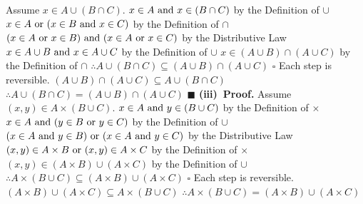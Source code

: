 \documentclass[12pt]{article}
\begin{document}
	Assume \(x \in A \cup (B \cap C)\). \newline
	\(x \in A \textup{ and } x \in (B \cap C)\) by the Definition of \(\cup\)
	\newline
	\(x \in A \textup{ or } (x \in B \textup{ and } x \in C)\) by the Definition of \(\cap\)
	\newline
	\((x \in A \textup{ or } x \in B) \textup{ and } (x \in A \textup{ or } x \in C)\) by the Distributive Law
	\newline
	\(x \in A \cup B \textup{ and } x \in A \cup C\) by the Definition of \(\cup\)
	\newline
	\(x \in (A \cup B) \cap (A \cup C)\) by the Definition of \(\cap\)
	\newline
	\(\therefore A \cup (B \cap C) \subseteq (A \cup B) \cap (A \cup C)\)
	\newline \(\square\) \newline
	Each step is reversible.
	\newline
	\((A \cup B) \cap (A \cup C) \subseteq A \cup (B \cap C)\)
	\newline
	\(\therefore A \cup (B \cap C) = (A \cup B) \cap (A \cup C)\)
	\newline \(\blacksquare\)
	\newline
	\newline
	\textbf{(iii)\ Proof.}
	\newline
	Assume \((x,y) \in A \times (B \cup C)\). \newline
	\(x \in A \textup{ and } y \in (B \cup C)\) by the Definition of \(\times\)
	\newline
	\(x \in A \textup{ and } (y \in B \textup{ or } y \in C)\) by the Definition of \(\cup\)
	\newline
	\((x \in A \textup{ and } y \in B) \textup{ or } (x \in A \textup{ and } y \in C)\) by the Distributive Law
	\newline
	\((x,y) \in A \times B \textup{ or } (x,y) \in A \times C\) by the Definition of \(\times\)
	\newline
	\((x,y) \in (A \times B) \cup (A \times C)\) by the Definition of \(\cup\)
	\newline
	\(\therefore A \times (B \cup C) \subseteq (A \times B) \cup (A \times C)\)
	\newline \(\square\) \newline
	Each step is reversible.
	\newline
	\((A \times B) \cup (A \times C) \subseteq A \times (B \cup C)\)
	\newline
	\(\therefore A \times (B \cup C) = (A \times B) \cup (A \times C)\)
\end{document}
